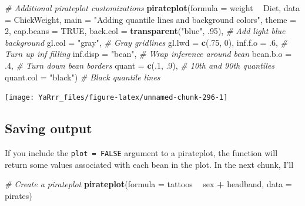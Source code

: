 \documentclass[]{book}
\newenvironment{Shaded}{\begin{snugshade}}{\end{snugshade}}
\newcommand{\KeywordTok}[1]{\textcolor[rgb]{0.13,0.29,0.53}{\textbf{#1}}}
\newcommand{\DataTypeTok}[1]{\textcolor[rgb]{0.13,0.29,0.53}{#1}}
\newcommand{\DecValTok}[1]{\textcolor[rgb]{0.00,0.00,0.81}{#1}}
\newcommand{\StringTok}[1]{\textcolor[rgb]{0.31,0.60,0.02}{#1}}
\newcommand{\CommentTok}[1]{\textcolor[rgb]{0.56,0.35,0.01}{\textit{#1}}}
\newcommand{\OtherTok}[1]{\textcolor[rgb]{0.56,0.35,0.01}{#1}}
\newcommand{\OperatorTok}[1]{\textcolor[rgb]{0.81,0.36,0.00}{\textbf{#1}}}
\newcommand{\NormalTok}[1]{#1}
\theoremstyle{definition}
\theoremstyle{definition}
\theoremstyle{remark}
\begin{document}
\begin{Shaded}
\begin{Highlighting}[]
\CommentTok{# Additional pirateplot customizations}
\KeywordTok{pirateplot}\NormalTok{(}\DataTypeTok{formula =}\NormalTok{ weight }\OperatorTok{~}\StringTok{ }\NormalTok{Diet, }
           \DataTypeTok{data =}\NormalTok{ ChickWeight,}
           \DataTypeTok{main =} \StringTok{"Adding quantile lines and background colors"}\NormalTok{,}
           \DataTypeTok{theme =} \DecValTok{2}\NormalTok{,}
           \DataTypeTok{cap.beans =} \OtherTok{TRUE}\NormalTok{,}
           \DataTypeTok{back.col =} \KeywordTok{transparent}\NormalTok{(}\StringTok{"blue"}\NormalTok{, .}\DecValTok{95}\NormalTok{), }\CommentTok{# Add light blue background}
           \DataTypeTok{gl.col =} \StringTok{"gray"}\NormalTok{, }\CommentTok{# Gray gridlines}
           \DataTypeTok{gl.lwd =} \KeywordTok{c}\NormalTok{(.}\DecValTok{75}\NormalTok{, }\DecValTok{0}\NormalTok{),}
           \DataTypeTok{inf.f.o =}\NormalTok{ .}\DecValTok{6}\NormalTok{, }\CommentTok{# Turn up inf filling}
           \DataTypeTok{inf.disp =} \StringTok{"bean"}\NormalTok{, }\CommentTok{# Wrap inference around bean}
           \DataTypeTok{bean.b.o =}\NormalTok{ .}\DecValTok{4}\NormalTok{, }\CommentTok{# Turn down bean borders}
           \DataTypeTok{quant =} \KeywordTok{c}\NormalTok{(.}\DecValTok{1}\NormalTok{, .}\DecValTok{9}\NormalTok{), }\CommentTok{# 10th and 90th quantiles}
           \DataTypeTok{quant.col =} \StringTok{"black"}\NormalTok{) }\CommentTok{# Black quantile lines}
\end{Highlighting}
\end{Shaded}

\begin{center}\texttt{[image: YaRrr\_files/figure-latex/unnamed-chunk-296-1]} \end{center}

\subsection{Saving output}\label{saving-output}

If you include the \texttt{plot\ =\ FALSE} argument to a pirateplot, the
function will return some values associated with each bean in the plot.
In the next chunk, I'll

\begin{Shaded}
\begin{Highlighting}[]
\CommentTok{# Create a pirateplot}
\KeywordTok{pirateplot}\NormalTok{(}\DataTypeTok{formula =}\NormalTok{ tattoos }\OperatorTok{~}\StringTok{ }\NormalTok{sex }\OperatorTok{+}\StringTok{ }\NormalTok{headband,}
           \DataTypeTok{data =}\NormalTok{ pirates)}
\end{Highlighting}
\end{Shaded}
\end{document}
